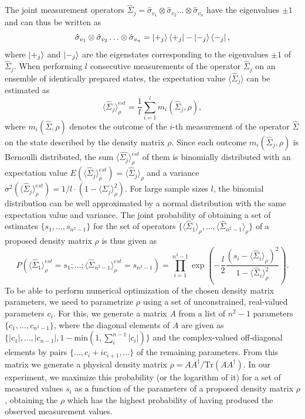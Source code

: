 \smallskip

The joint measurement operators $\hat{\Sigma}_j = \hat{\sigma}_{v_1}\otimes \hat{\sigma}_{v_2}\hdots \otimes\hat{\sigma}_{v_n}$ have the eigenvalues $\pm 1$ and can thus be written as 
\begin{equation}
\hat{\sigma}_{v_1}\otimes \hat{\sigma}_{v_2}\hdots \otimes\hat{\sigma}_{v_n} = \left| +_j \right>\left< +_j \right|-\left| -_j \right>\left< -_j \right|, \label{eq:ml_operators}
\end{equation}
where $\left| +_j \right>$ and $\left| -_j \right>$ are the eigenstates corresponding to the eigenvalues $\pm 1$ of $\hat{\Sigma}_j$. When performing $l$ consecutive measurements of the operator $\hat{\Sigma}_j$ on an ensemble of identically prepared states, the expectation value $\langle \hat{\Sigma}_j \rangle$ can be estimated as
%
\begin{equation}
\langle \hat{\Sigma}_j \rangle_\rho^{est}= \frac{1}{l}\sum\limits_{i = 1}^l m_i(\hat{\Sigma}_j,\rho), \label{eq:tomography_measurement_estimator}
\end{equation}
where $m_i(\hat{\Sigma},\rho)$ denotes the outcome of the $i$-th measurement of the operator $\hat{\Sigma}$ on the state described by the density matrix $\rho$. Since each outcome $m_i(\hat{\Sigma}_j,\rho)$ is Bernoulli distributed, the sum $\langle\hat{\Sigma_j}\rangle_\rho^{est}$ of them is binomially distributed with an expectation value \mbox{$E(\langle \hat{\Sigma}_j \rangle_\rho^{est}) = \langle \hat{\Sigma}_j \rangle_\rho$} and a variance $\sigma^2(\langle \hat{\Sigma}_j \rangle_\rho^{est}) = 1/l \cdot (1-\langle \hat{\Sigma}_j \rangle_\rho^2)$. For large sample sizes $l$, the binomial distribution can be well approximated by a normal distribution with the same expectation value and variance. The joint probability of obtaining a set of estimates $\{s_1,\hdots,s_{n^2-1}\}$ for the set of operators $\{\langle\hat{\Sigma}_1 \rangle_\rho,\hdots,\langle\hat{\Sigma}_{n^2-1} \rangle_\rho\}$ of a proposed density matrix $\rho$ is thus given as
%
\begin{equation}
P\left(\langle \hat{\Sigma}_1 \rangle_\rho^{est} = s_1;\hdots;\langle \hat{\Sigma}_{n^2-1} \rangle_\rho^{est} =  s_{n^2-1}\right) = \prod\limits_{i = 1}^{n^2-1} \exp{\left(-\frac{l}{2}\frac{(s_i-\langle \hat{\Sigma}_i \rangle_\rho)^2}{1-\langle \hat{\Sigma}_i \rangle_\rho^2}\right)}.
\end{equation}
%
To be able to perform numerical optimization of the chosen density matrix parameters, we need to parametrize $\rho$ using a set of unconstrained, real-valued parameters $c_i$. For this, we generate a matrix $A$ from a list of $n^2-1$ parameters $\{c_1,\hdots,c_{n^2-1}\}$, where the diagonal elements of $A$ are given as $\{|c_1|,\hdots,|c_{n-1}|,1-\mathrm{min}(1,\sum_i^{n-1}|c_{i}|)\}$ and the complex-valued off-diagonal elements by pairs $\{\hdots,c_{i}+ic_{i+1},\hdots\}$ of the remaining parameters. From this matrix we generate a physical density matrix $\rho=AA^\dagger/\mathrm{Tr}(AA^\dagger)$. In our experiment, we maximize this probability (or the logarithm of it) for a set of measured values $s_i$ as a function of the parameters of a proposed density matrix $\rho$, obtaining the $\rho$ which has the highest probability of having produced the observed measurement values.

